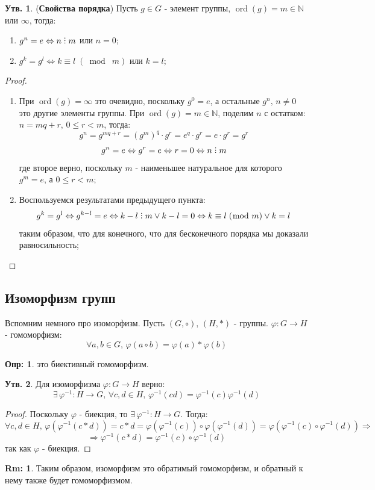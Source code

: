 \documentclass[12pt]{article}
\newcommand{\MN}{\mathbb{N}}
\theoremstyle{definition}
\newtheorem{defn}{Опр:}
\newtheorem{rem}{Rm:}
\newtheorem{prop}{Утв.}
\DeclareRobustCommand{\divby}{%
	\mathrel{\text{\vbox{\baselineskip.65ex\lineskiplimit0pt\hbox{.}\hbox{.}\hbox{.}}}}%
}
\DeclareMathOperator\ord{ord}
\newcommand{\modn}[3]{#1 \equiv #2 \; (\bmod \; #3)}
\begin{document}
\begin{prop}(\textbf{Свойства порядка}) Пусть $g \in G$ - элемент группы, $\ord(g) = m \in \MN$ или $\infty$, тогда:
	\begin{enumerate}[label=\arabic*)]
		\item $g^n = e \Leftrightarrow n \divby m$ или $n = 0$;
		\item $g^k = g^l \Leftrightarrow \modn{k}{l}{m}$ или $k = l$;
	\end{enumerate}
\end{prop}
\begin{proof}\hfill
	\begin{enumerate}[label=\arabic*)]
		\item При $\ord(g) = \infty$ это очевидно, поскольку $g^0 = e$, а остальные $g^n, \, n \neq 0$ это другие элементы группы. При $\ord(g)= m \in \MN$, поделим $n$ с остатком: $n = mq + r, \, 0 \leq r < m$, тогда:
		$$
			 g^n = g^{mq + r} = (g^m)^q{\cdot}g^r =e^q{\cdot}g^r = e{\cdot}g^r = g^r
		$$
		$$
			g^n = e \Leftrightarrow g^r = e \Leftrightarrow r = 0 \Leftrightarrow n \divby m
		$$
		где второе верно, поскольку $m$ - наименьшее натуральное для которого $g^m = e$, а $0 \leq r < m$;
		\item Воспользуемся результатами предыдущего пункта:
		$$
			g^k = g^l \Leftrightarrow g^{k - l} = e \Leftrightarrow k - l \divby m \vee k - l =0 \Leftrightarrow \modn{k}{l}{m} \vee k = l
		$$
		таким образом, что для конечного, что для бесконечного порядка мы доказали равносильность;
	\end{enumerate}
\end{proof}

\subsection*{Изоморфизм групп}
Вспомним немного про изоморфизм. Пусть $(G,\circ), \, (H, *)$ - группы. $\varphi \colon G \to H$ - гомоморфизм:
$$
	\forall a,b \in G, \, \varphi(a \circ b) = \varphi(a)*\varphi(b) 
$$
\begin{defn}
	 это биективный гомоморфизм.
\end{defn}

\begin{prop}
	Для изоморфизма $\varphi \colon G \to H$ верно:
	$$
		\exists\, \varphi^{-1} \colon H \to G, \, \forall c,d \in H, \, \varphi^{-1}(cd) = \varphi^{-1}(c)\varphi^{-1}(d)
	$$
\end{prop}
\begin{proof}
	Поскольку $\varphi$ - биекция, то $\exists\, \varphi^{-1} \colon H \to G$. Тогда:
	$$
		\forall c,d \in H, \, \varphi(\varphi^{-1}(c*d)) = c*d = \varphi(\varphi^{-1}(c))\circ\varphi(\varphi^{-1}(d)) = \varphi(\varphi^{-1}(c)\circ\varphi^{-1}(d)) \Rightarrow 
	$$
	$$
		\Rightarrow \varphi^{-1}(c*d) = \varphi^{-1}(c)\circ\varphi^{-1}(d)
	$$
	так как $\varphi$ - биекция.
\end{proof}
\begin{rem}
	Таким образом, изоморфизм это обратимый гомоморфизм, и обратный к нему также будет гомоморфизмом.
\end{rem}
\end{document}
